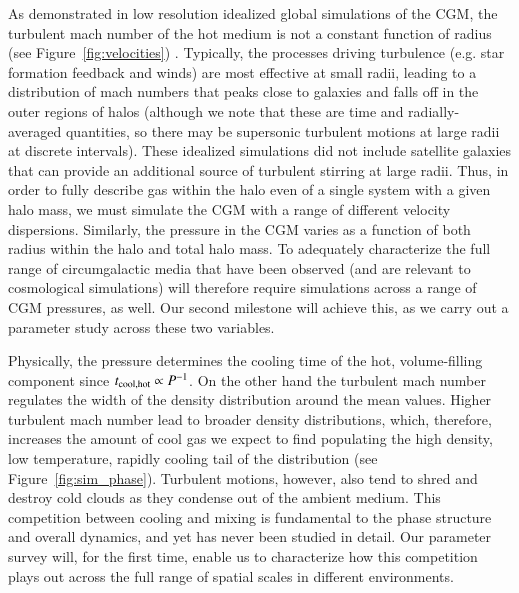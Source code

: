 \documentclass[11pt,letterpaper,english]{article}
\begin{document}
As demonstrated in low resolution idealized global simulations of the CGM, the turbulent mach number of the hot medium is not a constant function of radius (see Figure~\ref{fig:velocities}) \cite{Fielding17}. Typically, the processes driving turbulence (e.g. star formation feedback and winds) are most effective at small radii, leading to a distribution of mach numbers that peaks close to galaxies and falls off in the outer regions of halos (although we note that these are time and radially-averaged quantities, so there may be supersonic turbulent motions at large radii at discrete intervals). These idealized simulations did not include satellite galaxies that can provide an additional source of turbulent stirring at large radii. Thus, in order to fully describe gas within the halo even of a single system with a given halo mass, we must simulate the CGM with a range of different velocity dispersions. Similarly, the pressure in the CGM varies as a function of both radius within the halo and total halo mass. To adequately characterize the full range of circumgalactic media that have been observed (and are relevant to cosmological simulations) will therefore require simulations across a range of CGM pressures, as well. Our second milestone will achieve this, as we carry out a parameter study across these two variables.


Physically, the pressure determines the cooling time of the hot, volume-filling component since $t_{\rm cool, hot} \propto P^{-1}$. On the other hand the turbulent mach number regulates the width of the density distribution around the mean values. Higher turbulent mach number lead to broader density distributions, which, therefore, increases the amount of cool gas we expect to find populating the high density, low temperature, rapidly cooling tail of the distribution (see Figure~\ref{fig:sim_phase}). Turbulent motions, however, also tend to shred and destroy cold clouds as they condense out of the ambient medium. This competition between cooling and mixing is fundamental to the phase structure and overall dynamics, and yet has never been studied in detail. Our parameter survey will, for the first time, enable us to characterize how this competition plays out across the full range of spatial scales in different environments.
\end{document}
